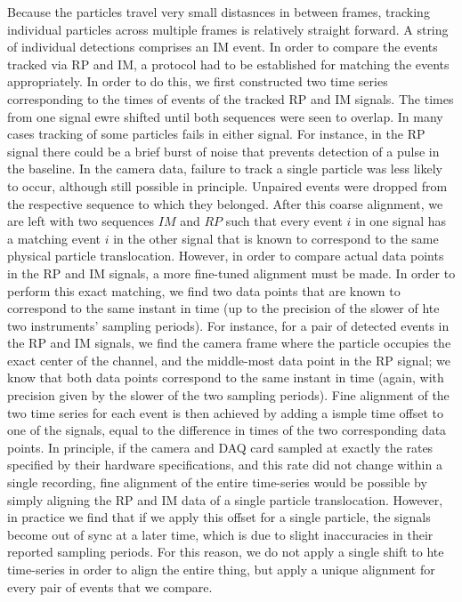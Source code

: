 		Because the particles travel very small distasnces in between frames, tracking individual particles across multiple frames is relatively straight forward. A string of individual detections comprises an IM event. In order to compare the events tracked via RP and IM, a protocol had to be established for matching the events appropriately. In order to do this, we first constructed two time series corresponding to the times of events of the tracked RP and IM signals. The times from one signal ewre shifted until both sequences were seen to overlap. In many cases tracking of some particles fails in either signal. For instance, in the RP signal there could be a brief burst of noise that prevents detection of a pulse in the baseline. In the camera data, failure to track a single particle was less likely to occur, although still possible in principle. Unpaired events were dropped from the respective sequence to which they belonged. After this coarse alignment, we are left with two sequences $IM$ and $RP$ such that every event $i$ in one signal has a matching event $i$ in the other signal that is known to correspond to the same physical particle translocation. However, in order to compare actual data points in the RP and IM signals, a more fine-tuned alignment must be made. In order to perform this exact matching, we find two data points that are known to correspond to the same instant in time (up to the precision of the slower of hte two instruments' sampling periods). For instance, for a pair of detected events in the RP and IM signals, we find the camera frame where the particle occupies the exact center of the channel, and the middle-most data point in the RP signal; we know that both data points correspond to the same instant in time (again, with precision given by the slower of the two sampling periods). Fine alignment of the two time series for each event is then achieved by adding a ismple time offset to one of the signals, equal to the difference in times of the two corresponding data points. In principle, if the camera and DAQ card sampled at exactly the rates specified by their hardware specifications, and this rate did not change within a single recording, fine alignment of the entire time-series would be possible by simply aligning the RP and IM data of a single particle translocation. However, in practice we find that if we apply this offset for a single particle, the signals become out of sync at a later time, which is due to slight inaccuracies in their reported sampling periods. For this reason, we do not apply a single shift to hte time-series in order to align the entire thing, but apply a unique alignment for every pair of events that we compare.
		
